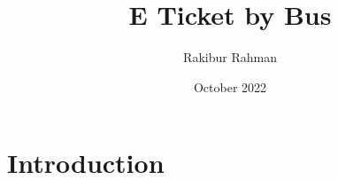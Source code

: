 \documentclass{article}
\title{E Ticket by Bus}
\author{Rakibur Rahman}
\date{October 2022}
\begin{document}
\maketitle

\section{Introduction}
\end{document}
